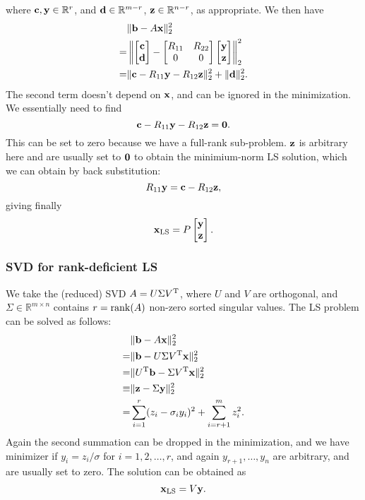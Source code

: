 \documentclass{article}
\begin{document}
where $\bm{\mathrm{c}}, \bm{\mathrm{y}}\in\mathbb{R}^r$, and $\bm{\mathrm{d}}\in\mathbb{R}^{m-r}$, $\bm{\mathrm{z}}\in\mathbb{R}^{n-r}$, as appropriate. We then have
\begin{align}
    &\lVert \bm{\mathrm{b}}-A\bm{\mathrm{x}}\rVert_2^2\\
    =&\left\lVert\begin{bmatrix}{\bm{\mathrm{c}}}\\{\bm{\mathrm{d}}}\end{bmatrix}-\begin{bmatrix}{R_{11}}&{R_{22}}\\{0}&{0}\end{bmatrix}\begin{bmatrix}{\bm{\mathrm{y}}}\\{\bm{\mathrm{z}}}\end{bmatrix}\right\rVert_2^2\\
    =&\lVert\bm{\mathrm{c}}-R_{11}\bm{\mathrm{y}}-R_{12}\bm{\mathrm{z}}\rVert_2^2+\lVert\bm{\mathrm{d}}\rVert^2_2.
\end{align}
The second term doesn't depend on $\bm{\mathrm{x}}$, and can be ignored in the minimization. We essentially need to find
\begin{equation}
    \bm{\mathrm{c}}-R_{11}\bm{\mathrm{y}}-R_{12}\bm{\mathrm{z}}=\bm{\mathrm{0}}.
\end{equation}
This can be set to zero because we have a full-rank sub-problem. $\bm{\mathrm{z}}$ is arbitrary here and are usually set to $\bm{\mathrm{0}}$ to obtain the minimium-norm LS solution, which we can obtain by back substitution:
\begin{equation}
    R_{11}\bm{\mathrm{y}}=\bm{\mathrm{c}}-R_{12}\bm{\mathrm{z}},
\end{equation}
giving finally 
\begin{equation}
    \bm{\mathrm{x}}_{\mathrm{LS}}=P\begin{bmatrix}{\bm{\mathrm{y}}}\\{\bm{\mathrm{z}}}\end{bmatrix}.
\end{equation}

\subsubsection{SVD for rank-deficient LS}
We take the (reduced) SVD $A=U\Sigma V^{\text{T}}$, where $U$ and $V$ are orthogonal, and $\Sigma\in\mathbb{R}^{m\times n}$ contains $r=\operatorname{rank}(A)$ non-zero sorted singular values. The LS problem can be solved as follows:
\begin{align}
    &\lVert \bm{\mathrm{b}}-A\bm{\mathrm{x}}\rVert_2^2\\
    =&\lVert \bm{\mathrm{b}}-U\Sigma V^{\text{T}}\bm{\mathrm{x}}\rVert_2^2\\
    =&\lVert U^{\text{T}}\bm{\mathrm{b}}-\Sigma V^{\text{T}}\bm{\mathrm{x}}\rVert_2^2\\
    \equiv&\lVert \bm{\mathrm{z}}-\Sigma \bm{\mathrm{y}}\rVert_2^2\\
    =&\sum_{i=1}^r(z_i-\sigma_iy_i)^2+\sum_{i=r+1}^mz_i^2.
\end{align}
Again the second summation can be dropped in the minimization, and we have minimizer if $y_i=z_i/\sigma$ for $i=1,2,\dots,r$, and again $y_{r+1},\dots,y_n$ are arbitrary, and are usually set to zero. The solution can be obtained as 
\begin{equation}
    \bm{\mathrm{x}}_{\mathrm{LS}}=V\bm{\mathrm{y}}.
\end{equation}
\end{document}

